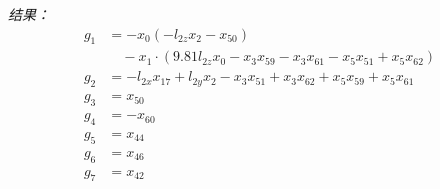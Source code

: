\documentclass[11pt]{article}
\begin{document}
\textit{结果：}
\begin{align*}
g_{1} &= - x_{0} \left(- l_{2z} x_{2} - x_{50}\right) \\
&\quad - x_{1} \cdot \left(9.81 l_{2z} x_{0} - x_{3} x_{59} - x_{3} x_{61} - x_{5} x_{51} + x_{5} x_{62}\right) \\
g_{2} &= - l_{2x} x_{17} + l_{2y} x_{2} - x_{3} x_{51} + x_{3} x_{62} + x_{5} x_{59} + x_{5} x_{61} \\
g_{3} &= x_{50} \\
g_{4} &= - x_{60} \\
g_{5} &= x_{44} \\
g_{6} &= x_{46} \\
g_{7} &= x_{42}
\end{align*}
\end{document}
